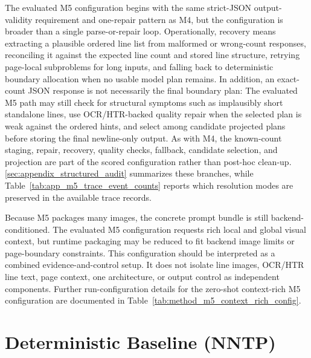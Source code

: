 The evaluated M5 configuration begins with the same strict-JSON output-validity requirement and one-repair pattern as M4, but the configuration is broader than a single parse-or-repair loop. Operationally, recovery means extracting a plausible ordered line list from malformed or wrong-count responses, reconciling it against the expected line count and stored line structure, retrying page-local subproblems for long inputs, and falling back to deterministic boundary allocation when no usable model plan remains. In addition, an exact-count JSON response is not necessarily the final boundary plan: The evaluated M5 path may still check for structural symptoms such as implausibly short standalone lines, use OCR/HTR-backed quality repair when the selected plan is weak against the ordered hints, and select among candidate projected plans before storing the final newline-only output. As with M4, the known-count staging, repair, recovery, quality checks, fallback, candidate selection, and projection are part of the scored configuration rather than post-hoc clean-up. \autoref{sec:appendix_structured_audit} summarizes these branches, while Table~\ref{tab:app_m5_trace_event_counts} reports which resolution modes are preserved in the available trace records.

Because M5 packages many images, the concrete prompt bundle is still backend-conditioned. The evaluated M5 configuration requests rich local and global visual context, but runtime packaging may be reduced to fit backend image limits or page-boundary constraints. This configuration should be interpreted as a combined evidence-and-control setup. It does not isolate line images, OCR/HTR line text, page context, one architecture, or output control as independent components. Further run-configuration details for the zero-shot context-rich M5 configuration are documented in Table~\ref{tab:method_m5_context_rich_config}.

\section{Deterministic Baseline (NNTP)}
\label{sec:method_nntp}

